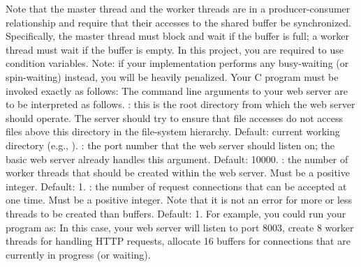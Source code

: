 {}Note that the master thread and the worker threads are in a producer-consumer relationship and require that their accesses to the shared buffer be synchronized. Specifically, the master thread must block and wait if the buffer is full; a worker thread must wait if the buffer is empty. In this project, you are required to use condition variables. Note: if your implementation performs any busy-waiting (or spin-waiting) instead, you will be heavily penalized.\markdownRendererInterblockSeparator
{}\markdownRendererInterblockSeparator
{}Your C program must be invoked exactly as follows:\markdownRendererInterblockSeparator
{}\markdownRendererInterblockSeparator
{}The command line arguments to your web server are to be interpreted as follows.\markdownRendererInterblockSeparator
{}\markdownRendererUlBeginTight
\markdownRendererUlItem {}: this is the root directory from which the web server should operate. The server should try to ensure that file accesses do not access files above this directory in the file-system hierarchy. Default: current working directory (e.g., ).\markdownRendererUlItemEnd 
\markdownRendererUlItem {}: the port number that the web server should listen on; the basic web server already handles this argument. Default: 10000.\markdownRendererUlItemEnd 
\markdownRendererUlItem {}: the number of worker threads that should be created within the web server. Must be a positive integer. Default: 1.\markdownRendererUlItemEnd 
\markdownRendererUlItem {}: the number of request connections that can be accepted at one time. Must be a positive integer. Note that it is not an error for more or less threads to be created than buffers. Default: 1.\markdownRendererUlItemEnd 
\markdownRendererUlEndTight \markdownRendererInterblockSeparator
{}For example, you could run your program as: \markdownRendererInterblockSeparator
{}In this case, your web server will listen to port 8003, create 8 worker threads for handling HTTP requests, allocate 16 buffers for connections that are currently in progress (or waiting).\markdownRendererInterblockSeparator
{}\markdownRendererInterblockSeparator
